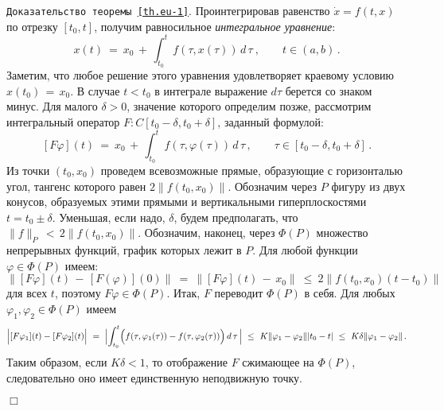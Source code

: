 \documentclass[12pt,a4paper]{article}
\begin{document}
{\tt Доказательство теоремы~\ref{th.eu-1}}.
Проинтегрировав равенство $\dot x = f(t, x)$ по отрезку $[t_0, t]$, получим равносильное
{\em интегральное уравнение}:
\begin{equation}\label{integr}
x(t) \ = \ x_0 \, + \, \int_{t_0}^t f(\tau, x(\tau))\, d \, \tau\ , \qquad t \in (a, b)\, .
\end{equation}
Заметим, что любое решение этого уравнения удовлетворяет краевому условию $x(t_0)\, = \, x_0$.
В случае $t < t_0$ в интеграле выражение $d\tau$ берется со знаком минус.
Для малого $\delta > 0$, значение которого определим позже, рассмотрим интегральный оператор
$F: C[t_0-\delta, t_0  +\delta]$, заданный формулой:
 $$
 [F\varphi](t) \ = \  x_0 \, + \, \int_{t_0}^t f(\tau, \varphi(\tau))\, d \, \tau\, , \qquad \tau \in [t_0-\delta, t_0  +\delta]\, .
 $$
Из точки $(t_0, x_0)$ проведем всевозможные прямые, образующие с горизонталью угол, тангенс которого равен  $2\|f(t_0, x_0)\|$.
Обозначим через $P$ фигуру из двух конусов, образуемых этими прямыми и вертикальными гиперплоскостями
$t = t_0 \pm \delta$. Уменьшая, если надо, $\delta$, будем предполагать, что
$\|f\|_{P} \, < \, 2 \|f(t_0, x_0)\|$. Обозначим, наконец, через $\Phi(P)$ множество непрерывных функций,
график которых лежит в $P$. Для любой функции $\varphi \in \Phi(P)$ имеем:
$$
\bigl\|[F\varphi](t) \, - \, [F(\varphi)](0)\bigr\|\  = \
\bigl\|[F\varphi](t) \, - \, x_0\bigr\|\  \le \ 2\bigl\|f(t_0, x_0) (t-t_0)\bigr\|
$$ для всех $t$, поэтому $F\varphi \in \Phi(P)$.
Итак, $F$ переводит $\Phi(P)$ в себя. Для любых $\varphi_1, \varphi_2 \in \Phi(P)$ имеем
$$
\Bigl|[F\varphi_1](t) - [F\varphi_2](t)\Bigr| \ = \
\Bigl| \int_{t_0}^t \Bigl( f(\tau, \varphi_1(\tau)) - f(\tau, \varphi_2(\tau))\Bigr)\, d \, \tau\, \Bigr|\ \le \
K \|\varphi_1 - \varphi_2\| |t_0 - t| \ \le \ K\delta \|\varphi_1 - \varphi_2\|\, .
$$
Таким образом, если $K \delta < 1$, то отображение $F$ сжимающее на $\Phi(P)$, следовательно оно имеет единственную неподвижную точку.


   {\hfill $\Box$}
\medskip
\end{document}
